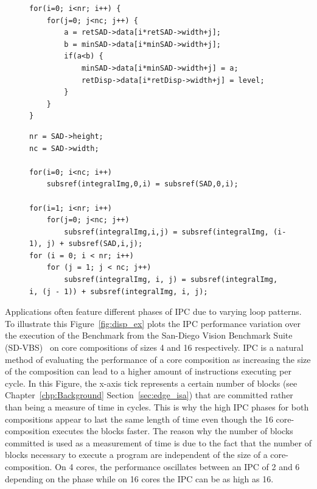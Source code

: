 \begin{figure}[t]
\lstset{language=C,numbersep=4pt}
\begin{center}
\begin{lstlisting}
for(i=0; i<nr; i++) {
	for(j=0; j<nc; j++) {
		a = retSAD->data[i*retSAD->width+j];
		b = minSAD->data[i*minSAD->width+j];
		if(a<b) {
			minSAD->data[i*minSAD->width+j] = a;
			retDisp->data[i*retDisp->width+j] = level;
		}
	}
}

\end{lstlisting}
\end{center}
\vspace{-1em}
\label{lst:low_ipc}
\end{figure}

\begin{figure}[t]
\lstset{language=C,numbersep=4pt}
\begin{center}
\begin{lstlisting}
nr = SAD->height;
nc = SAD->width;

for(i=0; i<nc; i++)
	subsref(integralImg,0,i) = subsref(SAD,0,i);

for(i=1; i<nr; i++)
	for(j=0; j<nc; j++) 
		subsref(integralImg,i,j) = subsref(integralImg, (i-1), j) + subsref(SAD,i,j);
for (i = 0; i < nr; i++)
	for (j = 1; j < nc; j++)
		subsref(integralImg, i, j) = subsref(integralImg, i, (j - 1)) + subsref(integralImg, i, j);

\end{lstlisting}
\end{center}
\vspace{-2em}
\label{lst:high_ipc}
\end{figure}

Applications often feature different phases of IPC due to varying loop patterns.
To illustrate this Figure~\ref{fig:disp_ex} plots the IPC performance variation over the execution of the  Benchmark from the San-Diego Vision Benchmark Suite (SD-VBS)~\cite{sdvbs} on core compositions of sizes 4 and 16 respectively.
IPC is a natural method of evaluating the performance of a core composition as increasing the size of the composition can lead to a higher amount of instructions executing per cycle.
In this Figure, the x-axis tick represents a certain number of blocks (see Chapter~\ref{chp:Background} Section~\ref{sec:edge_isa}) that are committed rather than being a measure of time in cycles.
This is why the high IPC phases for both compositions appear to last the same length of time even though the 16 core-composition executes the blocks faster.
The reason why the number of blocks committed is used as a measurement of time is due to the fact that the number of blocks necessary to execute a program are independent of the size of a core-composition.
On 4 cores, the performance oscillates between an IPC of 2 and 6 depending on the phase while on 16 cores the IPC can be as high as 16.

